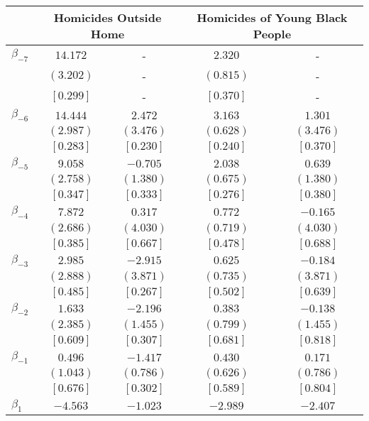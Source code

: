 \documentclass[12pt]{article}
\begin{document}
\begin{table}[H]
\centering
\label{tab:event_study_homicide_type_PE}
\begin{adjustbox}{scale=0.7}
\begin{tabular}{lcccc}
\toprule
& \multicolumn{2}{c}{Homicides Outside Home} & \multicolumn{2}{c}{Homicides of Young Black People} \\
\cmidrule(lr){2-3} \cmidrule(lr){4-5}
\midrule
$\beta_{-7}$ & $ 14.172$ & - & $  2.320$ & - \\
& $(  3.202)$ & - & $(  0.815)$ & - \\
& $[  0.299]$ & - & $[  0.370]$ & - \\
$\beta_{-6}$ & $ 14.444$ & $  2.472$ & $  3.163$ & $  1.301$ \\
& $(  2.987)$ & $(  3.476)$ & $(  0.628)$ & $(  3.476)$ \\
& $[  0.283]$ & $[  0.230]$ & $[  0.240]$ & $[  0.370]$ \\
$\beta_{-5}$ & $  9.058$ & $ -0.705$ & $  2.038$ & $  0.639$ \\
& $(  2.758)$ & $(  1.380)$ & $(  0.675)$ & $(  1.380)$ \\
& $[  0.347]$ & $[  0.333]$ & $[  0.276]$ & $[  0.380]$ \\
$\beta_{-4}$ & $  7.872$ & $  0.317$ & $  0.772$ & $ -0.165$ \\
& $(  2.686)$ & $(  4.030)$ & $(  0.719)$ & $(  4.030)$ \\
& $[  0.385]$ & $[  0.667]$ & $[  0.478]$ & $[  0.688]$ \\
$\beta_{-3}$ & $  2.985$ & $ -2.915$ & $  0.625$ & $ -0.184$ \\
& $(  2.888)$ & $(  3.871)$ & $(  0.735)$ & $(  3.871)$ \\
& $[  0.485]$ & $[  0.267]$ & $[  0.502]$ & $[  0.639]$ \\
$\beta_{-2}$ & $  1.633$ & $ -2.196$ & $  0.383$ & $ -0.138$ \\
& $(  2.385)$ & $(  1.455)$ & $(  0.799)$ & $(  1.455)$ \\
& $[  0.609]$ & $[  0.307]$ & $[  0.681]$ & $[  0.818]$ \\
$\beta_{-1}$ & $  0.496$ & $ -1.417$ & $  0.430$ & $  0.171$ \\
& $(  1.043)$ & $(  0.786)$ & $(  0.626)$ & $(  0.786)$ \\
& $[  0.676]$ & $[  0.302]$ & $[  0.589]$ & $[  0.804]$ \\
$\beta_{1}$ & $ -4.563$ & $ -1.023$ & $ -2.989$ & $ -2.407$ \\

\end{tabular}
\end{adjustbox}
\end{table}
\end{document}

